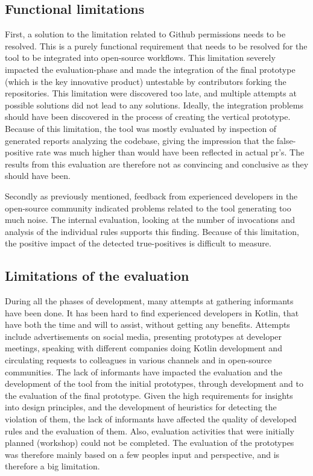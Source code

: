 \documentclass{report}
\begin{document}
\subsection*{Functional limitations}
First, a solution to the limitation related to Github permissions needs to be resolved. This is a purely functional requirement that needs to be resolved for the tool to be integrated into open-source workflows. This limitation severely impacted the evaluation-phase and made the integration of the final prototype (which is the key innovative product) untestable by contributors forking the repositories. This limitation were discovered too late, and multiple attempts at possible solutions did not lead to any solutions. Ideally, the integration problems should have been discovered in the process of creating the vertical prototype. Because of this limitation, the tool was mostly evaluated by inspection of generated reports analyzing the codebase, giving the impression that the false-positive rate was much higher than would have been reflected in actual \gls{pr}'s. The results from this evaluation are therefore not as convincing and conclusive as they should have been.

Secondly as previously mentioned, feedback from experienced developers in the open-source community indicated problems related to the tool generating too much noise. The internal evaluation, looking at the number of invocations and analysis of the individual rules supports this finding. Because of this limitation, the positive impact of the detected true-positives is difficult to measure. 

\subsection*{Limitations of the evaluation}
During all the phases of development, many attempts at gathering informants have been done. It has been hard to find experienced developers in Kotlin, that have both the time and will to assist, without getting any benefits. Attempts include advertisements on social media, presenting prototypes at developer meetings, speaking with different companies doing Kotlin development and circulating requests to colleagues in various channels and in open-source communities. The lack of informants have impacted the evaluation and the development of the tool from the initial prototypes, through development and to the evaluation of the final prototype. Given the high requirements for insights into design principles, and the development of heuristics for detecting the violation of them, the lack of informants have affected the quality of developed rules and the evaluation of them. Also, evaluation activities that were initially planned (workshop) could not be completed. The evaluation of the prototypes was therefore mainly based on a few peoples input and perspective, and is therefore a big limitation. 
\end{document}

